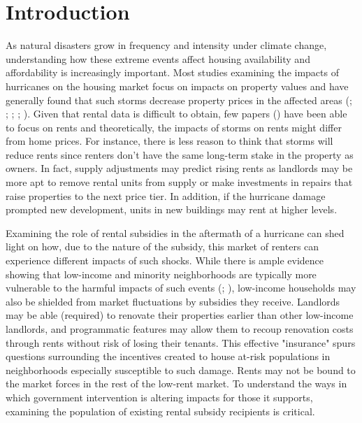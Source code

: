 \documentclass[12pt]{article}
\begin{document}
\section*{Introduction}
\doublespacing
As natural disasters grow in frequency and intensity under climate change, understanding how these extreme events affect housing availability and affordability is increasingly important.   Most studies examining the impacts of hurricanes on the housing market focus on impacts on property values and have generally found that such storms decrease property prices in the affected areas (\cite{bin_changes_2013}; \cite{bin_effects_2004}; \cite{hallstrom_market_2005}; \cite{ortega_rising_2018}; \cite{yi_housing_2020}). Given that rental data is difficult to obtain, few papers (\cite{an_rental_2020}) have been able to focus on rents and theoretically, the impacts of storms on rents might differ from home prices.  For instance, there is less reason to think that storms will reduce rents since renters don’t have the same long-term stake in the property as owners. In fact, supply adjustments may predict rising rents as landlords may be more apt to remove rental units from supply or make investments in repairs that raise properties to the next price tier.  In addition, if the hurricane damage prompted new development, units in new buildings may rent at higher levels.

Examining the role of rental subsidies in the aftermath of a hurricane can shed light on how, due to the nature of the subsidy, this market of renters can experience different impacts of such shocks.  While there is ample evidence showing that low-income and minority neighborhoods are typically more vulnerable to the harmful impacts of such events (\cite{cutter_social_2012}; \cite{van_zandt_mapping_2012}), low-income households may also be shielded from market fluctuations by subsidies they receive. Landlords may be able (required) to renovate their properties earlier than other low-income landlords, and programmatic features may allow them to recoup renovation costs through rents without risk of losing their tenants.  This effective "insurance" spurs questions surrounding the incentives created to house at-risk populations in neighborhoods especially susceptible to such damage. Rents may not be bound to the market forces in the rest of the low-rent market. To understand the ways in which government intervention is altering impacts for those it supports, examining the population of existing rental subsidy recipients is critical.
\end{document}

